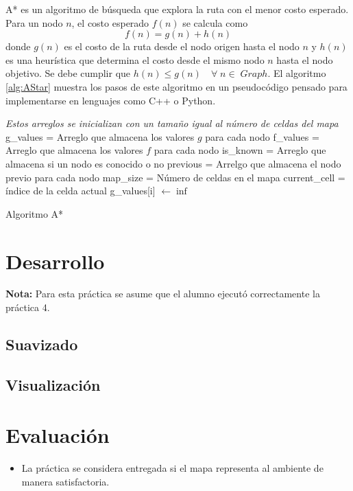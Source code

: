 \documentclass[letterpaper,12pt]{article}
\begin{document}
A* es un algoritmo de búsqueda que explora la ruta con el menor costo esperado. Para un nodo $n$, el costo esperado $f(n)$ se calcula como 
\[f(n) = g(n) + h(n)\]
donde $g(n)$ es el costo de la ruta desde el nodo origen hasta el nodo $n$ y $h(n)$ es una heurística que determina el costo desde el mismo nodo $n$ hasta el nodo objetivo. Se debe cumplir que $h(n) \leq g(n)\quad \forall\; n \in\; Graph$. El algoritmo \ref{alg:AStar} muestra los pasos de este algoritmo en un pseudocódigo pensado para implementarse en lenguajes como C++ o Python.
\begin{algorithm}
\DontPrintSemicolon
{}
\emph{Estos arreglos se inicializan con un tamaño igual al número de celdas del mapa}
g\_values = Arreglo que almacena los valores $g$ para cada nodo\;
f\_values = Arreglo que almacena los valores $f$ para cada nodo\;
is\_known = Arreglo que almacena si un nodo es conocido o no\;
previous = Arrelgo que almacena el nodo previo para cada nodo\;
\BlankLine
map\_size = Número de celdas en el mapa
current\_cell = índice de la celda actual
\BlankLine
\ForAll{ $i \in [0, map\_size)$}
{
  g\_values[i] $\leftarrow \inf$ 
}
\caption{Algoritmo A*}
\label{alg:AStar}
\end{algorithm}
\section{Desarrollo}
\textbf{Nota:} Para esta práctica se asume que el alumno ejecutó correctamente la práctica 4.


\subsection{Suavizado}
\subsection{Visualización}
\section{Evaluación}
\begin{itemize}
\item La práctica se considera entregada si el mapa representa al ambiente de manera satisfactoria. 
\end{itemize}
\end{document}
